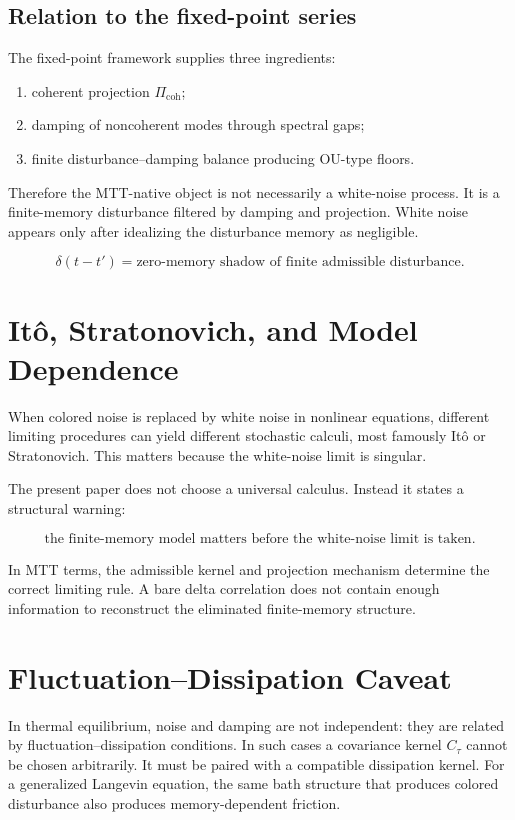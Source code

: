 \documentclass[11pt]{article}
\begin{document}
\subsection{Relation to the fixed-point series}

The fixed-point framework supplies three ingredients:
\begin{enumerate}
\item coherent projection \( \Pi_{\mathrm{coh}} \);
\item damping of noncoherent modes through spectral gaps;
\item finite disturbance--damping balance producing OU-type floors.
\end{enumerate}

Therefore the MTT-native object is not necessarily a white-noise process. It is a finite-memory disturbance filtered by damping and projection. White noise appears only after idealizing the disturbance memory as negligible.

\[
\boxed{
\delta(t-t')=
\text{zero-memory shadow of finite admissible disturbance}.
}
\]

\section{It\^{o}, Stratonovich, and Model Dependence}

When colored noise is replaced by white noise in nonlinear equations, different limiting procedures can yield different stochastic calculi, most famously It\^o or Stratonovich. This matters because the white-noise limit is singular.

The present paper does not choose a universal calculus. Instead it states a structural warning:

\[
\boxed{
\text{the finite-memory model matters before the white-noise limit is taken}.
}
\]

In MTT terms, the admissible kernel and projection mechanism determine the correct limiting rule. A bare delta correlation does not contain enough information to reconstruct the eliminated finite-memory structure.

\section{Fluctuation--Dissipation Caveat}

In thermal equilibrium, noise and damping are not independent: they are related by fluctuation--dissipation conditions. In such cases a covariance kernel \(C_\tau\) cannot be chosen arbitrarily. It must be paired with a compatible dissipation kernel. For a generalized Langevin equation, the same bath structure that produces colored disturbance also produces memory-dependent friction.
\end{document}
